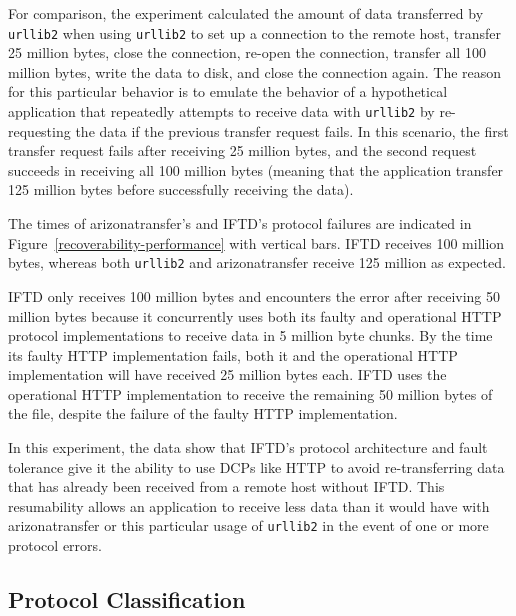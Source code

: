 For comparison, the experiment calculated the amount of data transferred by \texttt{urllib2} when using \texttt{urllib2} to set up a connection to the remote host, transfer 25 million bytes, close the connection, re-open the connection, transfer all 100 million bytes, write the data to disk, and close the connection again.  The reason for this particular behavior is to emulate the behavior of a hypothetical application that repeatedly attempts to receive data with \texttt{urllib2} by re-requesting the data if the previous transfer request fails.  In this scenario, the first transfer request fails after receiving 25 million bytes, and the second request succeeds in receiving all 100 million bytes (meaning that the application transfer 125 million bytes before successfully receiving the data).

The times of arizonatransfer's and IFTD's protocol failures are indicated in Figure~\ref{recoverability-performance} with vertical bars.  IFTD receives 100 million bytes, whereas both \texttt{urllib2} and arizonatransfer receive 125 million as expected.

IFTD only receives 100 million bytes and encounters the error after receiving 50 million bytes because it concurrently uses both its faulty and operational HTTP protocol implementations to receive data in 5 million byte chunks.  By the time its faulty HTTP implementation fails, both it and the operational HTTP implementation will have received 25 million bytes each.  IFTD uses the operational HTTP implementation to receive the remaining 50 million bytes of the file, despite the failure of the faulty HTTP implementation.

In this experiment, the data show that IFTD's protocol architecture and fault tolerance give it the ability to use DCPs like HTTP to avoid re-transferring data that has already been received from a remote host without IFTD.  This resumability allows an application to receive less data than it would have with arizonatransfer or this particular usage of \texttt{urllib2} in the event of one or more protocol errors.

\subsection{Protocol Classification}

